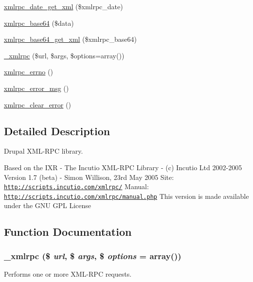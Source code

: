 \begin{DoxyCompactItemize}
\item 
\hyperlink{xmlrpc_8inc_aad3285fb3322b9452fc7b77acf4e608c}{xmlrpc\_\-date\_\-get\_\-xml} (\$xmlrpc\_\-date)
\item 
\hyperlink{xmlrpc_8inc_a0a49b5ffbb4c8e76bc96c2bc7b8d22dc}{xmlrpc\_\-base64} (\$data)
\item 
\hyperlink{xmlrpc_8inc_ad45673fd18d893a23b7b77d0c67f7b4a}{xmlrpc\_\-base64\_\-get\_\-xml} (\$xmlrpc\_\-base64)
\item 
\hyperlink{xmlrpc_8inc_a75ed600c83fb9a27ae92f949b6812749}{\_\-xmlrpc} (\$url, \$args, \$options=array())
\item 
\hyperlink{xmlrpc_8inc_af9d29505279c00e66545f3859550ff88}{xmlrpc\_\-errno} ()
\item 
\hyperlink{xmlrpc_8inc_abaf990108687e6e764164984306dbd55}{xmlrpc\_\-error\_\-msg} ()
\item 
\hyperlink{xmlrpc_8inc_afa5cac64bc9057f6ac904b870d9c1311}{xmlrpc\_\-clear\_\-error} ()
\end{DoxyCompactItemize}


\subsection{Detailed Description}
Drupal XML-\/RPC library.

Based on the IXR -\/ The Incutio XML-\/RPC Library -\/ (c) Incutio Ltd 2002-\/2005 Version 1.7 (beta) -\/ Simon Willison, 23rd May 2005 Site: \href{http://scripts.incutio.com/xmlrpc/}{\tt http://scripts.incutio.com/xmlrpc/} Manual: \href{http://scripts.incutio.com/xmlrpc/manual.php}{\tt http://scripts.incutio.com/xmlrpc/manual.php} This version is made available under the GNU GPL License 

\subsection{Function Documentation}
\hypertarget{xmlrpc_8inc_a75ed600c83fb9a27ae92f949b6812749}{
\subsubsection[{\_\-xmlrpc}]{\setlength{\rightskip}{0pt plus 5cm}\_\-xmlrpc (\$ {\em url}, \/  \$ {\em args}, \/  \$ {\em options} = {\ttfamily array()})}}
\label{xmlrpc_8inc_a75ed600c83fb9a27ae92f949b6812749}
Performs one or more XML-\/RPC requests.


